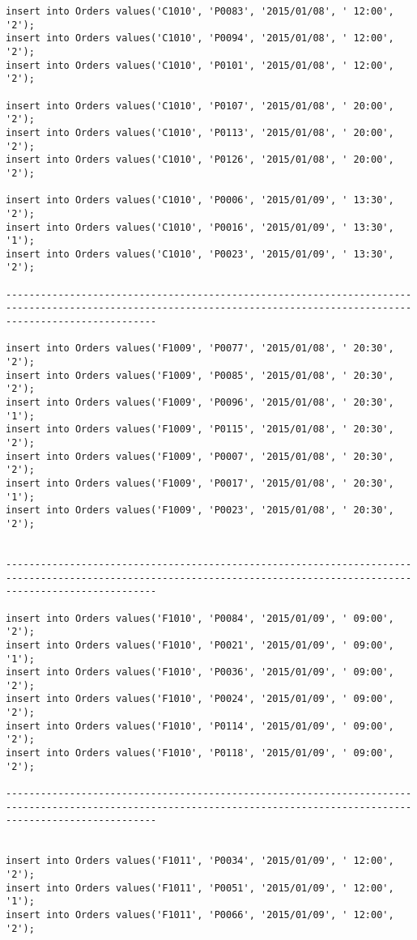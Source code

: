 \documentclass[a4,12pt]{report}
\begin{document}
\begin{lstlisting}
insert into Orders values('C1010', 'P0083', '2015/01/08', ' 12:00', '2');
insert into Orders values('C1010', 'P0094', '2015/01/08', ' 12:00', '2');
insert into Orders values('C1010', 'P0101', '2015/01/08', ' 12:00', '2');

insert into Orders values('C1010', 'P0107', '2015/01/08', ' 20:00', '2');
insert into Orders values('C1010', 'P0113', '2015/01/08', ' 20:00', '2');
insert into Orders values('C1010', 'P0126', '2015/01/08', ' 20:00', '2');

insert into Orders values('C1010', 'P0006', '2015/01/09', ' 13:30', '2');
insert into Orders values('C1010', 'P0016', '2015/01/09', ' 13:30', '1');
insert into Orders values('C1010', 'P0023', '2015/01/09', ' 13:30', '2');

----------------------------------------------------------------------------------------------------------------------------------------------------------------------

insert into Orders values('F1009', 'P0077', '2015/01/08', ' 20:30', '2');
insert into Orders values('F1009', 'P0085', '2015/01/08', ' 20:30', '2');
insert into Orders values('F1009', 'P0096', '2015/01/08', ' 20:30', '1');
insert into Orders values('F1009', 'P0115', '2015/01/08', ' 20:30', '2');
insert into Orders values('F1009', 'P0007', '2015/01/08', ' 20:30', '2');
insert into Orders values('F1009', 'P0017', '2015/01/08', ' 20:30', '1');
insert into Orders values('F1009', 'P0023', '2015/01/08', ' 20:30', '2');


----------------------------------------------------------------------------------------------------------------------------------------------------------------------

insert into Orders values('F1010', 'P0084', '2015/01/09', ' 09:00', '2');
insert into Orders values('F1010', 'P0021', '2015/01/09', ' 09:00', '1');
insert into Orders values('F1010', 'P0036', '2015/01/09', ' 09:00', '2');
insert into Orders values('F1010', 'P0024', '2015/01/09', ' 09:00', '2');
insert into Orders values('F1010', 'P0114', '2015/01/09', ' 09:00', '2');
insert into Orders values('F1010', 'P0118', '2015/01/09', ' 09:00', '2');

----------------------------------------------------------------------------------------------------------------------------------------------------------------------


insert into Orders values('F1011', 'P0034', '2015/01/09', ' 12:00', '2');
insert into Orders values('F1011', 'P0051', '2015/01/09', ' 12:00', '1');
insert into Orders values('F1011', 'P0066', '2015/01/09', ' 12:00', '2');


\end{lstlisting}
\end{document}
